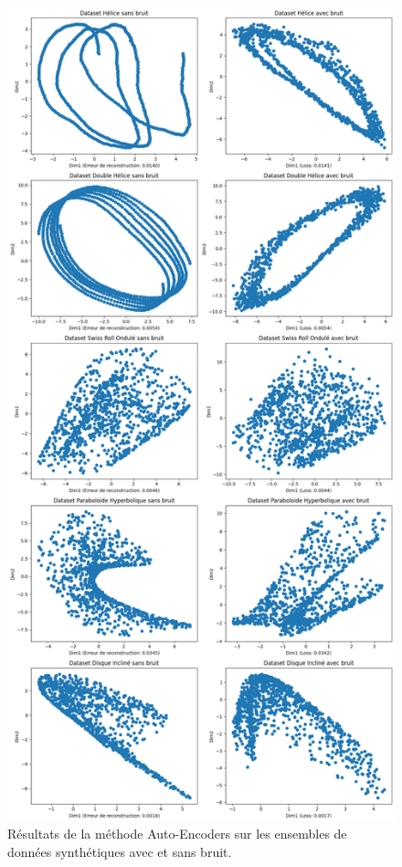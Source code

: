 \documentclass[unnumsec,webpdf,modern,large]{projet_manifold}%
\theoremstyle{thmstyleone}%
\theoremstyle{thmstyletwo}%
\theoremstyle{thmstylethree}%
\begin{document}
\begin{appendices}
\newpage
\thispagestyle{empty}
\vspace*{\fill}
\begin{figure}[b]
    \centering
    \includegraphics[width=\textwidth,height=0.8\textheight,keepaspectratio]{AE.png}
    \caption{Résultats de la méthode Auto-Encoders sur les ensembles de données synthétiques avec et sans bruit.}
    \label{fig:resultats_AE}
\end{figure}
\vspace*{\fill}

\end{appendices}
\end{document}
